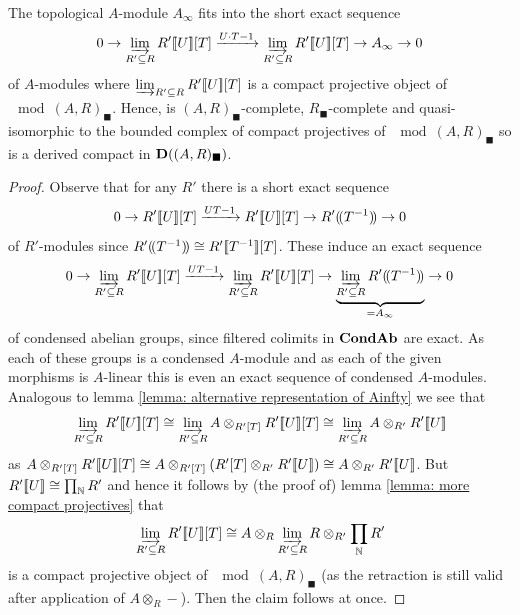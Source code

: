 \begin{lemma}
	\label{lemma: presentation for Afinty, general case}
	
	The topological $A$-module $A_\infty$ fits into the short exact sequence
		$$0\to \varinjlim_{R'\subseteq R} {R'[\![U]\!]}[T]\xrightarrow{U\cdot T - 1}\varinjlim_{R'\subseteq R} {R'[\![U]\!]}[T] \to A_\infty \to 0$$
	of $A$-modules where $\varinjlim_{R'\subseteq R} {R'[\![U]\!]}[T]$ is a compact projective object of $\mod{(A, R)_\blacksquare}$. Hence, is $(A, R)_\blacksquare$-complete, $R_\blacksquare$-complete and quasi-isomorphic to the bounded complex of compact projectives of $\mod{(A, R)_\blacksquare}$ so is a derived compact in ${{\mathbf{D}}((A, R)_\blacksquare)}$.
\end{lemma}
\begin{proof}
	Observe that for any $R'$ there is a short exact sequence
	$$0\to {R'[\![U]\!]}[T]\xrightarrow{UT-1} {R'[\![U]\!]}[T] \to {R'(\!(T^{-1})\!)}\to 0$$
	of $R'$-modules since ${R'(\!(T^{-1})\!)} \cong {R'[\![T^{-1}]\!]}[T]$. These induce an exact sequence
	$$0\to\varinjlim_{R'\subseteq R} {R'[\![U]\!]}[T] \xrightarrow{UT-1} \varinjlim_{R'\subseteq R} {R'[\![U]\!]}[T] \to \underbrace{\varinjlim_{R'\subseteq R} {R'(\!(T^{-1})\!)}}_{=A_\infty}\to 0$$
	of condensed abelian groups, since filtered colimits in ${{{\mathbf{Cond}}}{{\mathbf{Ab}}}}$ are exact. As each of these groups is a condensed $A$-module and as each of the given morphisms is $A$-linear this is even an exact sequence of condensed $A$-modules. Analogous to lemma \ref{lemma: alternative representation of Ainfty} we see that
		$$\varinjlim_{R'\subseteq R} {R'[\![U]\!]}[T] \cong \varinjlim_{R'\subseteq R} A\otimes_{R'[T]}{R'[\![U]\!]}[T]\cong \varinjlim_{R'\subseteq R} A\otimes_{R'}{R'[\![U]\!]}$$
	as $A\otimes_{R'[T]} {R'[\![U]\!]}[T]\cong A\otimes_{R'[T]} (R'[T]\otimes_{R'}{R'[\![U]\!]}) \cong A\otimes_{R'}{R'[\![U]\!]}$. But ${R'[\![U]\!]} \cong \prod_{\mathbb{N}} R'$ and hence it follows by (the proof of) lemma \ref{lemma: more compact projectives} that
		$$\varinjlim_{R'\subseteq R} {R'[\![U]\!]}[T] \cong A\otimes_{R}\varinjlim_{R'\subseteq R} R\otimes_{R'} \prod_{\mathbb{N}} R'$$
	is a compact projective object of $\mod{(A, R)_\blacksquare}$ (as the retraction is still valid after application of $A\otimes_{R} -$). Then the claim follows at once.
	

\end{proof}
